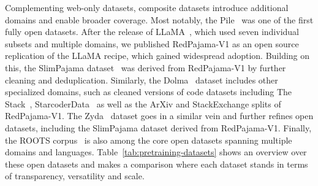 \documentclass{article}
\begin{document}
Complementing web-only datasets, composite datasets introduce additional domains and enable broader coverage. Most notably, the Pile~\cite{gao2020pile} was one of the first fully open datasets. 
After the release of LLaMA~\cite{touvron2023allama}, which used seven individual subsets and multiple domains, we published RedPajama-V1 as an open source replication of the LLaMA recipe, which gained widespread adoption. 
Building on this, the SlimPajama dataset~\cite{shen2023slimpajama} was derived from RedPajama-V1 by further cleaning and deduplication. 
Similarly, the Dolma~\cite{soldaini2024dolma} dataset includes other specialized domains, such as cleaned versions of code datasets including The Stack~\cite{Kocetkov2022TheStack}, StarcoderData~\cite{li2023starcoder} as well as the ArXiv and StackExchange splits of RedPajama-V1. The Zyda~\cite{tokpanov2024zyda} dataset goes in a similar vein and further refines open datasets, including the SlimPajama dataset derived from RedPajama-V1.
Finally, the ROOTS corpus~\cite{laurenccon2022bigscience,le2023bloom} is also among the core open datasets spanning multiple domains and languages. Table~\ref{tab:pretraining-datasets} shows an overview over these open datasets and makes a comparison where each dataset stands in terms of transparency, versatility and scale.
\end{document}
